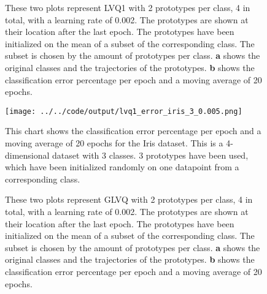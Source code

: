 \documentclass[twoside, a4paper, fleqn, reqno]{article}
\begin{document}
\begin{figure}[H]
	\centering
	\hfill
	\hfill
	\caption{
		These two plots represent LVQ1 with 2 prototypes per class, 4 in total, with a learning rate of 0.002.
		The prototypes are shown at their location after the last epoch. The prototypes have been
		initialized on the mean of a subset of the corresponding class. The subset is chosen by the amount of prototypes per class.
		\textbf{a} shows the original classes and the trajectories of the prototypes.
		\textbf{b} shows the classification error percentage per epoch and a moving average of 20 epochs.
	}
\end{figure}

\begin{figure}[H]
	\centering
	\texttt{[image: ../../code/output/lvq1\_error\_iris\_3\_0.005.png]}
	\label{fig:lvq1_error_iris_3_0.005}
	\caption{
		This chart shows the classification error percentage per epoch and a moving average of 20 epochs for the Iris dataset.
		This is a 4-dimensional dataset with 3 classes. 3 prototypes have been used,
		which have been initialized randomly on one datapoint from a corresponding class.
	}
\end{figure}

\begin{figure}[H]
	\centering
	\hfill
	\hfill
	\caption{
		These two plots represent GLVQ with 2 prototypes per class, 4 in total, with a learning rate of 0.002.
		The prototypes are shown at their location after the last epoch. The prototypes have been
		initialized on the mean of a subset of the corresponding class. The subset is chosen by the amount of prototypes per class.
		\textbf{a} shows the original classes and the trajectories of the prototypes.
		\textbf{b} shows the classification error percentage per epoch and a moving average of 20 epochs.
	}
\end{figure}
\end{document}
